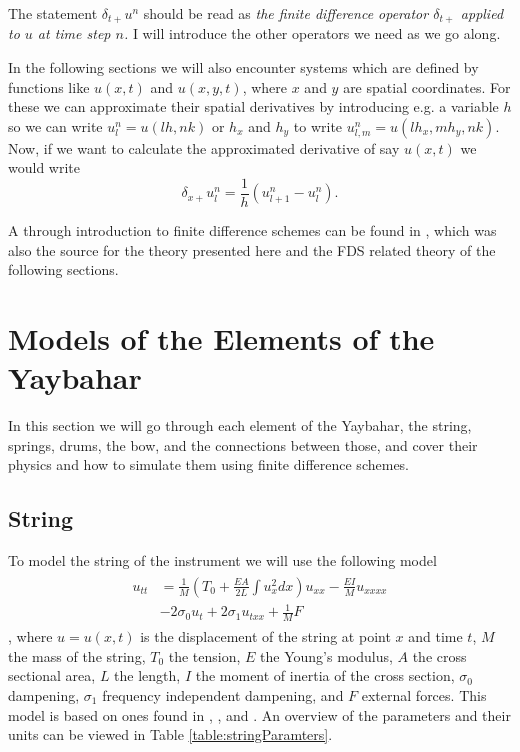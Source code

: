\documentclass{article}
\begin{document}
The statement $\delta_{t+}u^n$ should be read as \textit{the finite difference operator $\delta_{t+}$ applied to $u$ at time step $n$.}
I will introduce the other operators we need as we go along.

In the following sections we will also encounter systems which are defined by functions like $u(x, t)$ and $u(x, y, t)$, where $x$ and $y$ are spatial coordinates.
For these we can approximate their spatial derivatives by introducing e.g. a variable $h$ so we can write $u^n_l = u(lh, nk)$ or $h_x$ and $h_y$ to write $u^n_{l, m} = u(lh_x, mh_y, nk)$.
Now, if we want to calculate the approximated derivative of say $u(x, t)$ we would write
\begin{equation}
  \delta_{x+} u^n_l = \frac{1}{h} (u^n_{l+1} - u^n_{l}).
\end{equation}

A through introduction to finite difference schemes can be found in \cite{bilbao_numerical_2009}, which was also the source for the theory presented here and the FDS related theory of the following sections.

\section{Models of the Elements of the Yaybahar}
\label{sec:elements}

In this section we will go through each element of the Yaybahar, the string, springs, drums, the bow, and the connections between those, and cover their physics and how to simulate them using finite difference schemes.

\subsection{String}
\label{sec:string}

To model the string of the instrument we will use the following model
\begin{align}
  \begin{split}
  u_{tt} &= \frac{1}{M} \left(T_0 + \frac{E A}{2L} \int u_x^2 dx \right)u_{xx} - \frac{E I}{M} u_{xxxx}\\
  &- 2 \sigma_0 u_t + 2 \sigma_1 u_{txx} + \frac{1}{M} F
  \end{split}
  \label{eq:stiffNonlinearString}
\end{align},
where $u = u(x, t)$ is the displacement of the string at point $x$ and time $t$, $M$ the mass of the string, $T_0$ the tension, $E$ the Young's modulus, $A$ the cross sectional area, $L$ the length, $I$ the moment of inertia of the cross section, $\sigma_0$ dampening, $\sigma_1$ frequency independent dampening, and $F$ external forces.
This model is based on ones found in \cite[Chapters~6,7, and 8] {bilbao_numerical_2009}, \cite{bilbao_modular_2009}, and \cite{bensa_simulation_2003}.
An overview of the parameters and their units can be viewed in Table \ref{table:stringParamters}.
\end{document}
